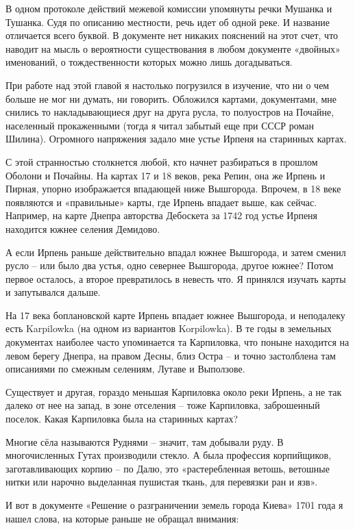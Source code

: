 В одном протоколе действий межевой комиссии упомянуты речки Мушанка и Тушанка. Судя по описанию местности, речь идет об одной реке. И название отличается всего буквой. В документе нет никаких пояснений на этот счет, что наводит на мысль о вероятности существования в любом документе «двойных» именований, о тождественности которых можно лишь догадываться.

При работе над этой главой я настолько погрузился в изучение, что ни о чем больше не мог ни думать, ни говорить. Обложился картами, документами, мне снились то накладывающиеся друг на друга русла, то полуостров на Почайне, населенный прокаженными (тогда я читал забытый еще при СССР роман Шилина). Огромного напряжения задало мне устье Ирпеня на старинных картах.

С этой странностью столкнется любой, кто начнет разбираться в прошлом Оболони и Почайны. На картах 17 и 18 веков, река Репин, она же Ирпень и Пирная, упорно изображается впадающей ниже Вышгорода. Впрочем, в 18 веке появляются и «правильные» карты, где Ирпень впадает выше, как сейчас. Например, на карте Днепра авторства Дебоскета за 1742 год устье Ирпеня находится южнее селения Демидово.

А если Ирпень раньше действительно впадал южнее Вышгорода, и затем сменил русло – или было два устья, одно севернее Вышгорода, другое южнее? Потом первое осталось, а второе превратилось в невесть что. Я принялся изучать карты и запутывался дальше.

На 17 века боплановской карте Ирпень впадает южнее Вышгорода, и неподалеку есть Karpilowka (на одном из вариантов Korpilowka). В те годы в земельных документах наиболее часто упоминается та Карпиловка, что поныне находится на левом берегу Днепра, на правом Десны, близ Остра – и точно застолблена там описаниями по смежным селениям, Лутаве и Выползове.

Существует и другая, гораздо меньшая Карпиловка около реки Ирпень, а не так далеко от нее на запад, в зоне отселения – тоже Карпиловка, заброшенный поселок. Какая Карпиловка была на старинных картах?

Многие сёла называются Руднями – значит, там  добывали руду. В многочисленных Гутах производили стекло. А была профессия корпийщиков, заготавливающих корпию – по Далю, это «растеребленная ветошь, ветошные нитки или нарочно выделанная пушистая ткань, для перевязки ран и язв».

И вот в документе «Решение о разграничении земель города Киева» 1701 года я нашел слова, на которые раньше не обращал внимания:

